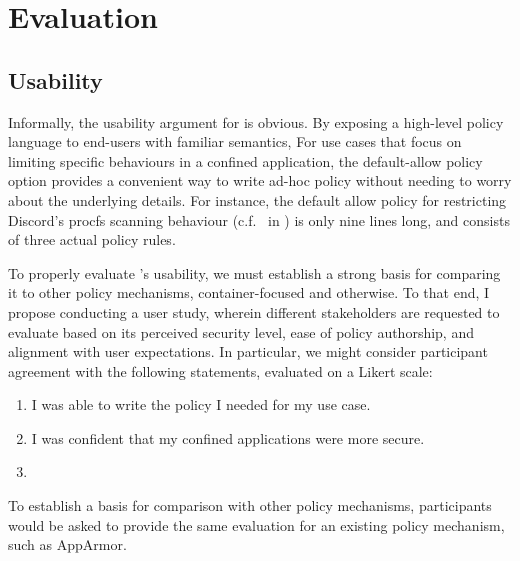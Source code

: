 \section{Evaluation}
\label{sec:eval}

\subsection{Usability}

Informally, the usability argument for \bpfcontain{} is obvious. By exposing a high-level policy language to end-users with familiar semantics, \bpfcontain{}
 For use cases that focus on limiting specific behaviours in a confined application, the default-allow policy option provides a convenient way to write ad-hoc policy without needing to worry about the underlying details. For instance, the default allow policy for restricting Discord's procfs scanning behaviour (c.f.~ in ) is only nine lines long, and consists of three actual policy rules.

To properly evaluate \bpfcontain{}'s usability, we must establish a strong basis for comparing it to other policy mechanisms, container-focused and otherwise. To that end, I propose conducting a user study, wherein different stakeholders are requested to evaluate \bpfcontain{} based on its perceived security level, ease of policy authorship, and alignment with user expectations.  In particular, we might consider participant agreement with the following statements, evaluated on a Likert scale:
\begin{enumerate}[label=\bf Q\arabic*.]
  \item I was able to write the policy I needed for my use case.
  \item I was confident that my confined applications were more secure.
  \item {}
\end{enumerate}
To establish a basis for comparison with other policy mechanisms, participants would be asked to provide the same evaluation for an existing policy mechanism, such as AppArmor.

